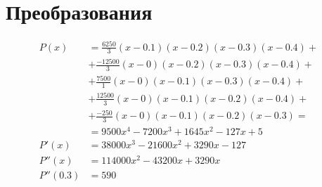 \documentclass[../main.tex]{subfiles}
\begin{document}
\section{Преобразования}


\begin{align*}
    P(x) & = \frac{6250}{3}(x-0.1)(x-0.2)(x-0.3)(x-0.4) + & \\
      & + \frac{-12500}{3}(x-0)(x-0.2)(x-0.3)(x-0.4) + & \\
      & + \frac{7500}{1}(x-0)(x-0.1)(x-0.3)(x-0.4) + & \\
      & + \frac{12500}{3}(x-0)(x-0.1)(x-0.2)(x-0.4) + & \\
      & + \frac{-250}{3}(x-0)(x-0.1)(x-0.2)(x-0.3) = & \\
      & = 9500 x^4 - 7200 x^3 + 1645 x^2 - 127 x + 5 & \\
    P'(x) & = 38000 x^3 - 21600 x^2 + 3290 x - 127 & \\
    P''(x) & = 114000 x^2 - 43200 x + 3290 x & \\
    P''(0.3) & = 590 &
\end{align*}
\end{document}
